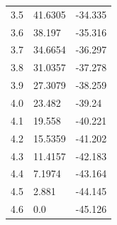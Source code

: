 \begin{table}
\begin{tabular}{lll}
3.5 & 41.6305 & -34.335 \\
3.6 & 38.197 & -35.316 \\
3.7 & 34.6654 & -36.297 \\
3.8 & 31.0357 & -37.278 \\
3.9 & 27.3079 & -38.259 \\
4.0 & 23.482 & -39.24 \\
4.1 & 19.558 & -40.221 \\
4.2 & 15.5359 & -41.202 \\
4.3 & 11.4157 & -42.183 \\
4.4 & 7.1974 & -43.164 \\
4.5 & 2.881 & -44.145 \\
4.6 & 0.0 & -45.126 \\
\bottomrule
\end{tabular}
\end{table}
